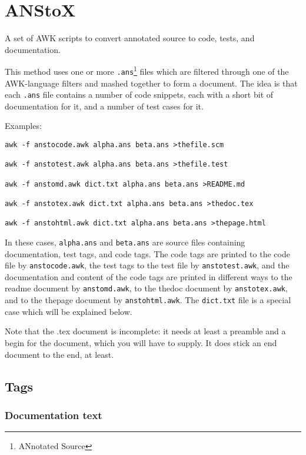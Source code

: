 \part{ANStoX}
\label{anstox}

A set of AWK scripts to convert annotated source to code, tests, and documentation.


This method uses one or more \texttt{.ans}\footnote{ANnotated Source} files which are filtered through one of the AWK-language filters and mashed together to form a document. The idea is that each \texttt{.ans} file contains a number of code snippets, each with a short bit of documentation for it, and a number of test cases for it.


Examples:

\begin{verbatim}
awk -f anstocode.awk alpha.ans beta.ans >thefile.scm

awk -f anstotest.awk alpha.ans beta.ans >thefile.test

awk -f anstomd.awk dict.txt alpha.ans beta.ans >README.md

awk -f anstotex.awk dict.txt alpha.ans beta.ans >thedoc.tex

awk -f anstohtml.awk dict.txt alpha.ans beta.ans >thepage.html
\end{verbatim}

In these cases, \texttt{alpha.ans} and \texttt{beta.ans} are source files containing documentation, test tags, and code tags. The code tags are printed to the code file by \texttt{anstocode.awk}, the test tags to the test file by \texttt{anstotest.awk}, and the documentation and content of the code tags are printed in different ways to the readme document by \texttt{anstomd.awk}, to the thedoc document by \texttt{anstotex.awk}, and to the thepage document by \texttt{anstohtml.awk}. The \texttt{dict.txt} file is a special case which will be explained below.


Note that the .tex document is incomplete: it needs at least a preamble and a begin for the document, which you will have to supply. It does stick an end document to the end, at least.

\chapter{Tags}
\label{tags}
\section{Documentation text}
\label{documentation-text}

